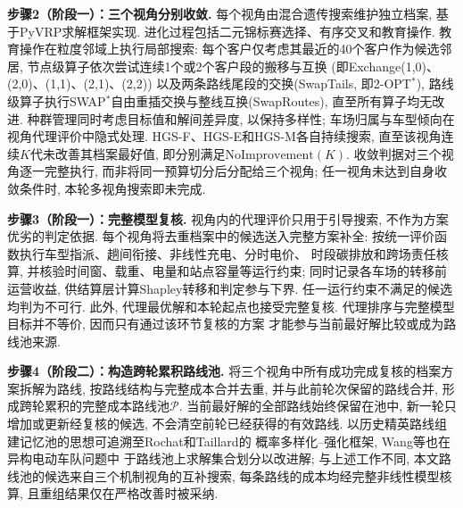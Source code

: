 \documentclass{setp-new}
\begin{document}
\textbf{步骤2（阶段一）：三个视角分别收敛.}
每个视角由混合遗传搜索\cite{ref:76}维护独立档案,
基于PyVRP求解框架\cite{ref:64}实现.
进化过程包括二元锦标赛选择、有序交叉和教育操作.
教育操作在粒度邻域上执行局部搜索: 每个客户仅考虑其最近的40个客户作为候选邻居,
节点级算子依次尝试连续1个或2个客户段的搬移与互换
(即Exchange(1,0)、(2,0)、(1,1)、(2,1)、(2,2))
以及两条路线尾段的交换(SwapTails, 即2-OPT$^*$),
路线级算子执行SWAP$^*$自由重插交换与整线互换(SwapRoutes),
直至所有算子均无改进.
种群管理同时考虑目标值和解间差异度, 以保持多样性\cite{ref:77};
车场归属与车型倾向在视角代理评价中隐式处理\cite{ref:78}.
HGS-F、HGS-E和HGS-M各自持续搜索, 直至该视角连续$K$代未改善其档案最好值,
即分别满足$\mathrm{NoImprovement}(K)$.
收敛判据对三个视角逐一完整执行, 而非将同一预算切分后分配给三个视角;
任一视角未达到自身收敛条件时, 本轮多视角搜索即未完成.

\textbf{步骤3（阶段一）：完整模型复核.}
视角内的代理评价只用于引导搜索, 不作为方案优劣的判定依据.
每个视角将去重档案中的候选送入完整方案补全:
按统一评价函数执行车型指派、趟间衔接、非线性充电、分时电价、
时段碳排放和跨场责任核算, 并核验时间窗、载重、电量和站点容量等运行约束;
同时记录各车场的转移前运营收益, 供结算层计算Shapley转移和判定参与下界.
任一运行约束不满足的候选均判为不可行.
此外, 代理最优解和本轮起点也接受完整复核.
代理排序与完整模型目标并不等价, 因而只有通过该环节复核的方案
才能参与当前最好解比较或成为路线池来源.

\textbf{步骤4（阶段二）：构造跨轮累积路线池.}
将三个视角中所有成功完成复核的档案方案拆解为路线, 按路线结构与完整成本合并去重,
并与此前轮次保留的路线合并, 形成跨轮累积的完整成本路线池$\mathcal P$.
当前最好解的全部路线始终保留在池中, 新一轮只增加或更新经复核的候选,
不会清空前轮已经获得的有效路线.
以历史精英路线组建记忆池的思想可追溯至Rochat和Taillard\cite{ref:79}的
概率多样化--强化框架, Wang等\cite{ref:80}也在异构电动车队问题中
于路线池上求解集合划分以改进解; 与上述工作不同,
本文路线池的候选来自三个机制视角的互补搜索,
每条路线的成本均经完整非线性模型核算,
且重组结果仅在严格改善时被采纳.
\end{document}
